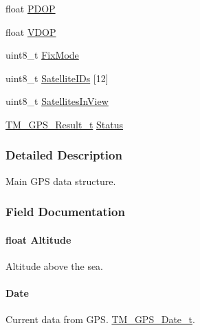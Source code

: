 \begin{DoxyCompactItemize}
float \hyperlink{struct_t_m___g_p_s___data__t_a6dd866c20bf7ae6fed7f62afc4470c89}{P\+D\+O\+P}
\item 
float \hyperlink{struct_t_m___g_p_s___data__t_a560dd464380970f473ab405e6bd61169}{V\+D\+O\+P}
\item 
uint8\+\_\+t \hyperlink{struct_t_m___g_p_s___data__t_a9c26de3f6932e8ef1ffcf461733ceffb}{Fix\+Mode}
\item 
uint8\+\_\+t \hyperlink{struct_t_m___g_p_s___data__t_a8173b8ba1d29304a2daac7364773666e}{Satellite\+I\+Ds} \mbox{[}12\mbox{]}
\item 
uint8\+\_\+t \hyperlink{struct_t_m___g_p_s___data__t_aa39923999b8128954eea86cc60f77dd9}{Satellites\+In\+View}
\item 
\hyperlink{group___t_m___g_p_s___typedefs_gaf3a9184315a145cb8288691c9c529427}{T\+M\+\_\+\+G\+P\+S\+\_\+\+Result\+\_\+t} \hyperlink{struct_t_m___g_p_s___data__t_a605069be4b6e2a728b2528036f127f22}{Status}
\end{DoxyCompactItemize}


\subsubsection{Detailed Description}
Main G\+P\+S data structure. 

\subsubsection{Field Documentation}
\hypertarget{struct_t_m___g_p_s___data__t_acc81deedbd68806fa549c2b92a3d21e0}{}
\paragraph[{Altitude}]{\setlength{\rightskip}{0pt plus 5cm}float Altitude}\label{struct_t_m___g_p_s___data__t_acc81deedbd68806fa549c2b92a3d21e0}
Altitude above the sea. \hypertarget{struct_t_m___g_p_s___data__t_a2835529eed7641976b4df1b460174b14}{}
\paragraph[{Date}]{ Date}\label{struct_t_m___g_p_s___data__t_a2835529eed7641976b4df1b460174b14}
Current data from G\+P\+S. \hyperlink{struct_t_m___g_p_s___date__t}{T\+M\+\_\+\+G\+P\+S\+\_\+\+Date\+\_\+t}. \hypertarget{struct_t_m___g_p_s___data__t_ae2fdd834ad7e266ee87728da45d6da23}{}
